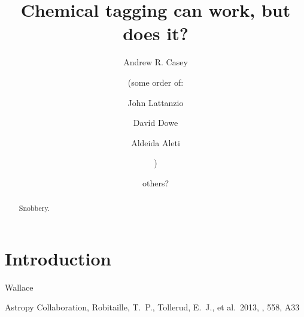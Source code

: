 \documentclass{aastex61}
\begin{document}
\title{Chemical tagging can work, but does it?}



\author[0000-0003-0174-0564]{Andrew R. Casey}

\author{(some order of:}

\author[0000-0003-2952-859X]{John Lattanzio}

\author[0000-0002-0583-5918]{David Dowe} 

\author[0000-0002-1716-690X]{Aldeida Aleti}


\author{)}

\author{others?}
 
\begin{abstract}
Snobbery.
\end{abstract}

\keywords{}

\section{Introduction} 
\label{sec:introduction}



\acknowledgments
Wallace



\begin{thebibliography}{}

 Astropy Collaboration, Robitaille, T.~P., Tollerud, E.~J., et al.\ 2013, \aap, 558, A33 

\end{thebibliography}
\end{document}
